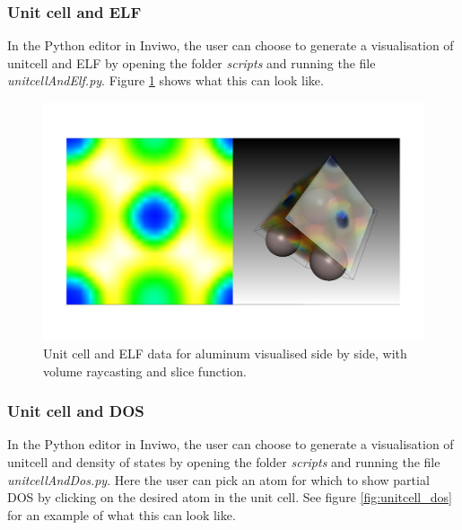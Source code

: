 \documentclass[a4paper,12pt]{article}
\begin{document}
\subsubsection{Unit cell and ELF}
In the Python editor in Inviwo, the user can choose to generate a visualisation of unitcell and ELF by opening the folder \textit{scripts} and running the file \textit{unitcellAndElf.py}. Figure \ref{fig:sammankoppling} shows what this can look like.

\begin{figure} [H]
\centering
\includegraphics[scale=0.25]{screenshot_sammankoppling_Al.png}
\caption{Unit cell and ELF data for aluminum visualised side by side, with volume raycasting and slice function.}
\label{fig:sammankoppling}
\end{figure}

\subsubsection{Unit cell and DOS}
\label{ch:unitcell_dos}
In the Python editor in Inviwo, the user can choose to generate a visualisation of unitcell and density of states by opening the folder \textit{scripts} and running the file \textit{unitcellAndDos.py}. Here the user can pick an atom for which to show partial DOS by clicking on the desired atom in the unit cell. See figure \ref{fig:unitcell_dos} for an example of what this can look like.
\end{document}
